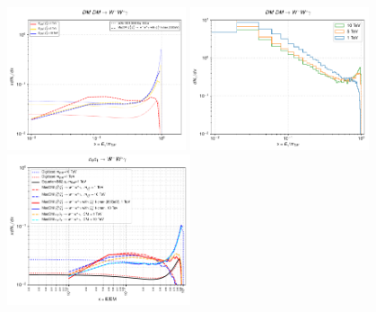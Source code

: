 \documentclass[epj,nopacs,fleqn]{svjour}
\begin{document}
\begin{figure}[!h]
	\centering
	\subfigure
	{ \includegraphics[width=0.47\textwidth]{Fig/Ready/Gammas_Validation.pdf} }
	\subfigure
	{ \includegraphics[width=0.47\textwidth]{Fig/Ready/simple_Gammas.pdf} }
	\subfigure
{ \includegraphics[width=0.48\textwidth]{Fig/Ready/Gammas_Validation_nu.pdf} }	
	
	\caption{}
	\label{n1n1a}
\end{figure}


\clearpage
\end{document}
